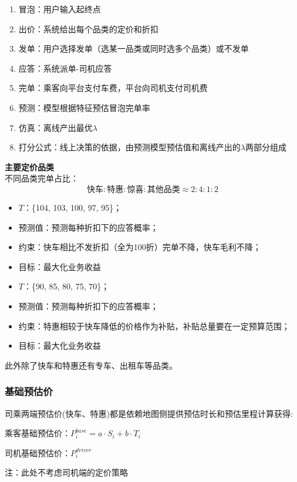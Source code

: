 \documentclass[12pt, a4paper]{article}
\begin{document}
\begin{enumerate}
\item 冒泡：用户输入起终点
\item 出价：系统给出每个品类的定价和折扣
\item 发单：用户选择发单（选某一品类或同时选多个品类）或不发单
\item 应答：系统派单-司机应答
\item 完单：乘客向平台支付车费，平台向司机支付司机费
\item 预测：模型根据特征预估冒泡完单率
\item 仿真：离线产出最优$\lambda$
\item 打分公式：线上决策的依据，由预测模型预估值和离线产出的$\lambda$两部分组成
\end{enumerate}
\textbf{主要定价品类}\\
不同品类完单占比：
\begin{equation}
  \text{快车} : \text{特惠} : \text{惊喜} : \text{其他品类} \approx 2 : 4 : 1 : 2
\end{equation}
\begin{itemize}
    \item $T$：\{104, 103, 100, 97, 95\}；
    \item 预测值：预测每种折扣下的应答概率；
    \item 约束：快车相比不发折扣（全为100折）完单不降，快车毛利不降；
    \item 目标：最大化业务收益
\end{itemize}
\begin{itemize}
    \item $T$：\{90, 85, 80, 75, 70\}；
    \item 预测值：预测每种折扣下的应答概率；
    \item 约束：特惠相较于快车降低的价格作为补贴，补贴总量要在一定预算范围；
    \item 目标：最大化业务收益
\end{itemize}
此外除了快车和特惠还有专车、出租车等品类。

\subsubsection{基础预估价}司乘两端预估价(快车、特惠)都是依赖地图侧提供预估时长和预估里程计算获得:\par
乘客基础预估价：$P^{base}_i=a\cdot S_i+b\cdot T_i$\par
司机基础预估价：$P^{driver}_i$\par
注：此处不考虑司机端的定价策略
\end{document}
